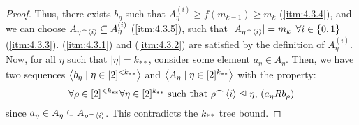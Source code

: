 \begin{lemma}[Claim 4.3]
\begin{proof}
            Thus, there exists $b_\eta$ such that $A_\eta^{(i)} \geq f(m_{k-1}) \geq m_{k}$ (\ref{itm:4.3.4}), and we can choose
            $A_{\eta^\frown \left< i \right>} \subseteq A_\eta^{(i)}$ (\ref{itm:4.3.5}), such that
            $|A_{\eta^\frown \left< i \right>}| = m_{k}$ $\forall i \in \left\{ 0,1 \right\}$ (\ref{itm:4.3.3}).
            (\ref{itm:4.3.1}) and (\ref{itm:4.3.2}) are satisfied by the definition of $A_\eta^{(i)}$.
            Now, for all $\eta$ such that $|\eta| = k_{**}$, consider some element $a_\eta \in A_\eta$.
            Then, we have two sequences $\left< b_\eta \mid \eta \in [2]^{<k_{**}} \right>$ and $\left< A_\eta \mid \eta \in [2]^{k_{**}} \right>$
            with the property:
            \[
                \forall \rho \in [2]^{<k_{**}} \forall \eta \in [2]^{k_{**}} \text{ such that } \rho^\frown \left< i \right> \trianglelefteq
                    \eta \text{, } (a_\eta R b_\rho)
            \]
            since $a_\eta \in A_\eta \subseteq A_{\rho ^\frown \left< i \right>}$.
            This contradicts the $k_{**}$ tree bound.
        \end{proof}
    \end{lemma}

